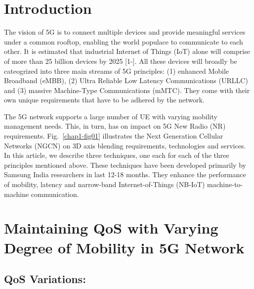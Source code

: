 \begin{multicols}{2}

\section{Introduction}

The vision of 5G is to connect multiple devices and provide meaningful services under a common rooftop, enabling the world populace to communicate to each other. It is estimated that industrial Internet of Things (IoT) alone will comprise of more than 25 billion devices by 2025 [\cite{art4-key01}1-\cite{art4-key02}]. All these devices will broadly be cateogrized into three main streams of 5G principles: (1) enhanced Mobile Broadband (eMBB), (2) Ultra Reliable Low Latency Communications (URLLC) and (3) massive Machine-Type Communications (mMTC). They come with their own unique requirements that have to be adhered by the network.

The 5G network supports a large number of UE with varying mobility management needs. This, in turn, has on impact on 5G New Radio (NR) requirements. Fig.~\ref{chap1-fig01} illustrates the Next Generation Cellular Networks (NGCN) on 3D axis blending requirements, technologies and services. In this article, we describe three techniques, one each for each of the three principles mentioned above. These techniques have been developed primarily by Samsung India researchers in last 12-18 months. They enhance the performance of mobility, latency and narrow-band Internet-of-Things (NB-IoT) machine-to-machine communication. 



\section{Maintaining QoS with Varying Degree of Mobility in 5G Network}

\subsection{QoS Variations:}


\end{multicols}
